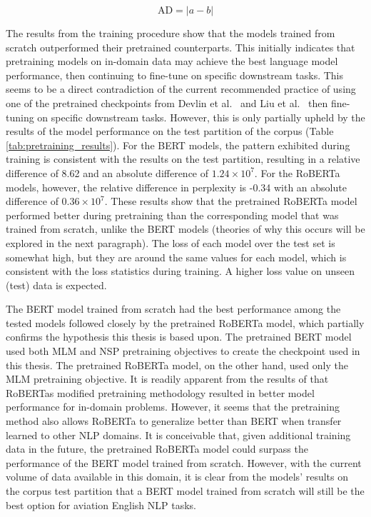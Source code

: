 \documentclass[12pt]{article}
\begin{document}
\begin{equation}\label{eq:absolute_difference}
    \mbox{AD} = |a - b|
\end{equation}

The results from the training procedure show that the models trained from scratch outperformed their pretrained counterparts. This initially indicates that pretraining models on in-domain data may achieve the best language model performance, then continuing to fine-tune on specific downstream tasks. This seems to be a direct contradiction of the current recommended practice of using one of the pretrained checkpoints from Devlin et al.~\cite{devlin_bert_2019} and Liu et al.~\cite{liu_roberta_2019} then fine-tuning on specific downstream tasks. However, this is only partially upheld by the results of the model performance on the test partition of the corpus (Table \ref{tab:pretraining_results}). For the BERT models, the pattern exhibited during training is consistent with the results on the test partition, resulting in a relative difference of 8.62 and an absolute difference of $1.24 \times 10^7$. For the RoBERTa models, however, the relative difference in perplexity is -0.34 with an absolute difference of $0.36 \times 10^7$. These results show that the pretrained RoBERTa model performed better during pretraining than the corresponding model that was trained from scratch, unlike the BERT models (theories of why this occurs will be explored in the next paragraph). The loss of each model over the test set is somewhat high, but they are around the same values for each model, which is consistent with the loss statistics during training. A higher loss value on unseen (test) data is expected.

The BERT model trained from scratch had the best performance among the tested models followed closely by the pretrained RoBERTa model, which partially confirms the hypothesis this thesis is based upon. The pretrained BERT model used both MLM and NSP pretraining objectives to create the checkpoint used in this thesis. The pretrained RoBERTa model, on the other hand, used only the MLM pretraining objective. It is readily apparent from the results of \cite{liu_roberta_2019} that RoBERTas modified pretraining methodology resulted in better model performance for in-domain problems. However, it seems that the pretraining method also allows RoBERTa to generalize better than BERT when transfer learned to other NLP domains. It is conceivable that, given additional training data in the future, the pretrained RoBERTa model could surpass the performance of the BERT model trained from scratch. However, with the current volume of data available in this domain, it is clear from the models' results on the corpus test partition that a BERT model trained from scratch will still be the best option for aviation English NLP tasks.
\end{document}
